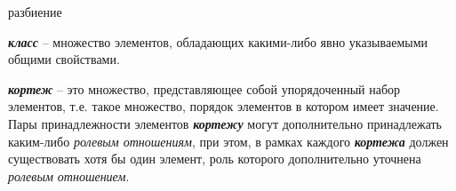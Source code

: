 

	

\begin{SCn}
\begin{scnrelfromset}{разбиение}
\end{scnrelfromset}
\end{SCn}

\textbf{\textit{класс}} – множество элементов, обладающих какими-либо явно указываемыми общими свойствами.

\begin{SCn}
\end{SCn}

\textbf{\textit{кортеж}} – это множество, представляющее собой упорядоченный набор элементов, т.е. такое множество, порядок элементов в котором имеет значение. Пары принадлежности элементов \textbf{\textit{кортежу}} могут дополнительно принадлежать каким-либо \textit{ролевым отношениям}, при этом, в рамках каждого \textbf{\textit{кортежа}} должен существовать хотя бы один элемент, роль которого дополнительно уточнена \textit{ролевым отношением}.


\begin{SCn}
\end{SCn}

